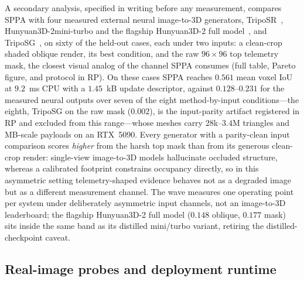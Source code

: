 \documentclass[11pt,a4paper]{article}
\begin{document}
A secondary analysis, specified in writing before any measurement, compares
SPPA with four measured external neural image-to-3D generators,
TripoSR~\cite{tochilkin2024triposr}, Hunyuan3D-2mini-turbo and the flagship
Hunyuan3D-2 full model~\cite{zhao2025hunyuan3d}, and
TripoSG~\cite{triposg2025}, on sixty of the held-out cases, each under two
inputs: a clean-crop shaded oblique render, its best condition, and the raw
\(96\times96\) top telemetry mask, the closest visual analog of the channel
SPPA consumes (full table, Pareto figure, and protocol in RP). On these cases
SPPA reaches \(0.561\) mean voxel IoU at \(9.2\)~ms CPU with a
\(1.45\)~kB update descriptor, against \(0.128\)--\(0.231\) for the measured
neural outputs over seven of the eight method-by-input conditions---the
eighth, TripoSG on the raw mask (\(0.002\)), is the input-parity artifact
registered in RP and excluded from this range---whose meshes carry
\(28\)k--\(3.4\)M triangles and MB-scale payloads on an RTX~5090. Every
generator with a parity-clean input comparison scores \emph{higher} from the
harsh top mask than from its generous clean-crop render: single-view
image-to-3D models hallucinate occluded structure, whereas a calibrated
footprint constrains occupancy directly, so in this asymmetric setting
telemetry-shaped evidence behaves not as a degraded image but as a different
measurement channel. The wave measures one operating point per system under
deliberately asymmetric input channels, not an image-to-3D leaderboard; the
flagship Hunyuan3D-2 full model (\(0.148\) oblique, \(0.177\)
mask) sits inside the same band as its distilled mini/turbo variant,
retiring the distilled-checkpoint caveat.

\subsection{Real-image probes and deployment runtime}
\label{sec:deployment-summary}
\end{document}

